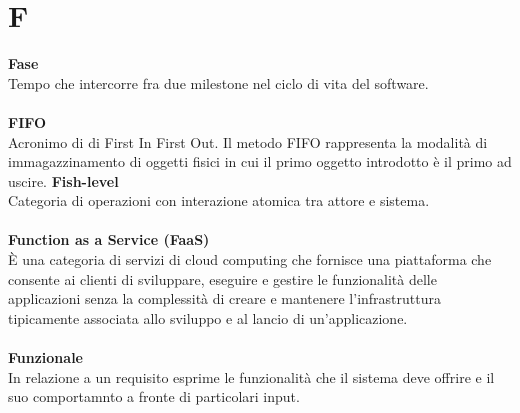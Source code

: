 \section{F}
\textbf{Fase}\\
Tempo che intercorre fra due milestone nel ciclo di vita del software. \\ \\
\textbf{FIFO}\\
Acronimo di di First In First Out. Il metodo FIFO rappresenta la modalità di immagazzinamento di oggetti fisici in cui il primo oggetto introdotto è il primo ad uscire. 
\textbf{Fish-level}\\
Categoria di operazioni con interazione atomica tra attore e sistema. \\ \\
\textbf{Function as a Service (FaaS)}\\
È una categoria di servizi di cloud computing che fornisce una piattaforma che consente ai clienti di sviluppare, eseguire e gestire le funzionalità delle applicazioni senza la complessità di creare e mantenere l'infrastruttura tipicamente associata allo sviluppo e al lancio di un'applicazione. \\ \\
\textbf{Funzionale}\\
In relazione a un requisito esprime le funzionalità che il sistema deve offrire e il suo comportamnto a fronte di particolari input.\\ 
\clearpage
